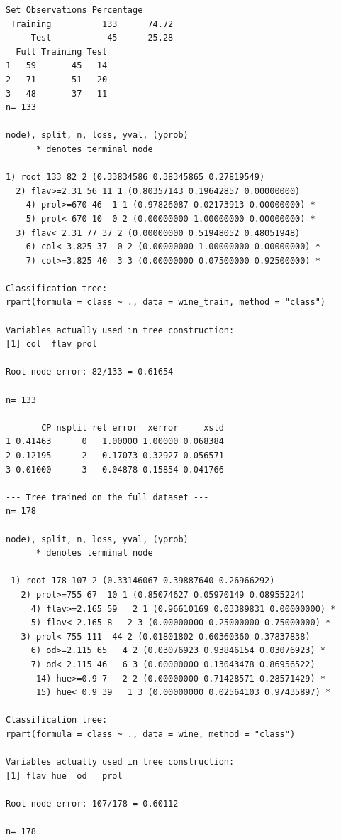 \documentclass[11pt,a4paper]{article}
\begin{document}
\begin{lstlisting}[style=console]
      Set Observations Percentage
 Training          133      74.72
     Test           45      25.28
  Full Training Test
1   59       45   14
2   71       51   20
3   48       37   11
n= 133 

node), split, n, loss, yval, (yprob)
      * denotes terminal node

1) root 133 82 2 (0.33834586 0.38345865 0.27819549)  
  2) flav>=2.31 56 11 1 (0.80357143 0.19642857 0.00000000)  
    4) prol>=670 46  1 1 (0.97826087 0.02173913 0.00000000) *
    5) prol< 670 10  0 2 (0.00000000 1.00000000 0.00000000) *
  3) flav< 2.31 77 37 2 (0.00000000 0.51948052 0.48051948)  
    6) col< 3.825 37  0 2 (0.00000000 1.00000000 0.00000000) *
    7) col>=3.825 40  3 3 (0.00000000 0.07500000 0.92500000) *

Classification tree:
rpart(formula = class ~ ., data = wine_train, method = "class")

Variables actually used in tree construction:
[1] col  flav prol

Root node error: 82/133 = 0.61654

n= 133 

       CP nsplit rel error  xerror     xstd
1 0.41463      0   1.00000 1.00000 0.068384
2 0.12195      2   0.17073 0.32927 0.056571
3 0.01000      3   0.04878 0.15854 0.041766

--- Tree trained on the full dataset ---
n= 178 

node), split, n, loss, yval, (yprob)
      * denotes terminal node

 1) root 178 107 2 (0.33146067 0.39887640 0.26966292)  
   2) prol>=755 67  10 1 (0.85074627 0.05970149 0.08955224)  
     4) flav>=2.165 59   2 1 (0.96610169 0.03389831 0.00000000) *
     5) flav< 2.165 8   2 3 (0.00000000 0.25000000 0.75000000) *
   3) prol< 755 111  44 2 (0.01801802 0.60360360 0.37837838)  
     6) od>=2.115 65   4 2 (0.03076923 0.93846154 0.03076923) *
     7) od< 2.115 46   6 3 (0.00000000 0.13043478 0.86956522)  
      14) hue>=0.9 7   2 2 (0.00000000 0.71428571 0.28571429) *
      15) hue< 0.9 39   1 3 (0.00000000 0.02564103 0.97435897) *

Classification tree:
rpart(formula = class ~ ., data = wine, method = "class")

Variables actually used in tree construction:
[1] flav hue  od   prol

Root node error: 107/178 = 0.60112

n= 178 


\end{lstlisting}
\end{document}
